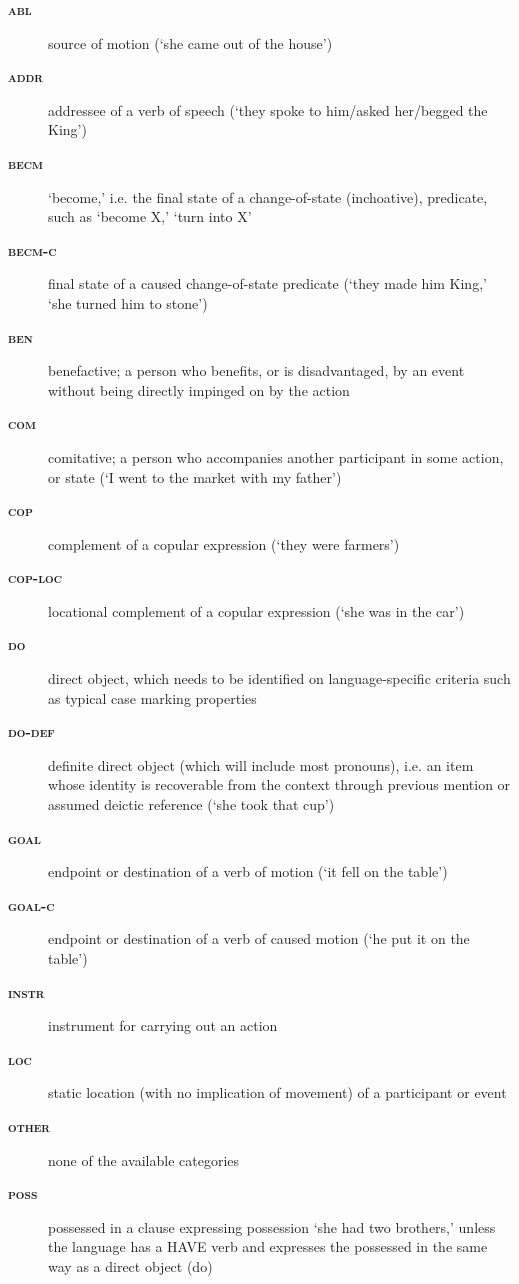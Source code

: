 \documentclass[output=paper,colorlinks,citecolor=brown,collectionchapter]{langscibook}
\begin{document}
\begin{description}
\item[\bfseries\upshape\textsc{abl}] source of motion (`she came out of the house')
\item[\bfseries\upshape\textsc{addr}] {addressee} of a verb of speech (`they spoke to him/asked her/begged the King')
\item[\bfseries\upshape\textsc{becm}] `become,' i.e. the final state of a change-of-state ({inchoative}), predicate, such as `become X,' `turn into X'
\item[\bfseries\upshape\textsc{becm-c}] final state of a caused change-of-state predicate (`they made him King,' `she turned him to stone')
\item[\bfseries\upshape\textsc{ben}] {benefactive}; a person who benefits, or is disadvantaged, by an event without being directly impinged on by the action
\item[\bfseries\upshape\textsc{com}] {comitative}; a person who accompanies another participant in some action, or state (`I went to the market with my father')
\item[\bfseries\upshape\textsc{cop}] {complement} of a copular expression (`they were farmers')
\item[\bfseries\upshape\textsc{cop-loc}] locational {complement} of a copular expression (`she was in the car')
\item[\bfseries\upshape\textsc{do}] {direct object}, which needs to be identified on language-specific criteria such as typical case marking properties
\item[\bfseries\upshape\textsc{do-def}] definite direct object (which will include most pronouns), i.e. an item whose identity is recoverable from the context through previous mention or assumed deictic reference (`she took that cup')
\item[\bfseries\upshape\textsc{goal}] {endpoint} or destination of a verb of motion (`it fell on the table')
\item[\bfseries\upshape\textsc{goal-c}] {endpoint} or destination of a verb of caused motion (`he put it on the table')
\item[\bfseries\upshape\textsc{instr}] {instrument} for carrying out an action
\item[\bfseries\upshape\textsc{loc}] static location (with no implication of movement) of a participant or event
\item[\bfseries\upshape\textsc{other}] none of the available categories
\item[\bfseries\upshape\textsc{poss}] possessed in a clause expressing possession `she had two brothers,' unless the language has a HAVE verb and expresses the possessed in the same way as a {direct object} (do)

\end{description}
\end{document}

